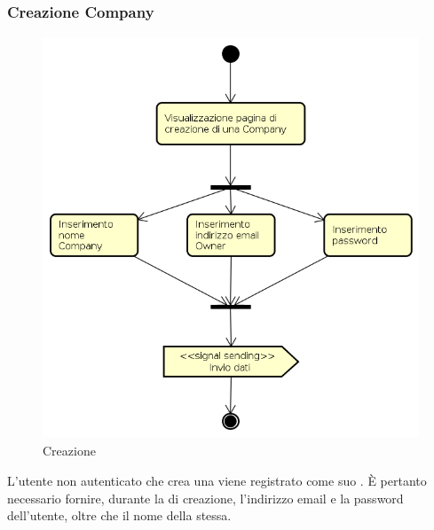\subsubsection{Creazione Company}
\begin{figure}[H]
\begin{center}
\includegraphics[height=12cm]{res/sections/backend/activities/creazioneCompany.png}
\caption{Creazione }
\end{center}
\end{figure}
L'utente non autenticato che crea una  viene registrato come suo . È pertanto necessario fornire, durante la  di creazione, l'indirizzo email e la password dell'utente, oltre che il nome della  stessa.
\newpage
